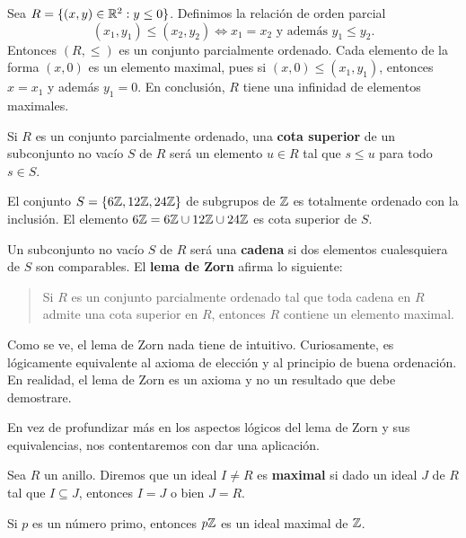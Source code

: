 \begin{example}
Sea $R=\{(x,y)\in\mathbb{R}^2:y\leq 0\}$. Definimos la relación de orden parcial 
\[
(x_1,y_1)\leq (x_2,y_2)\Longleftrightarrow x_1=x_2\text{ y además }y_1\leq y_2.
\]
Entonces $(R,\leq)$ es un conjunto parcialmente ordenado. Cada elemento de la forma $(x,0)$ 
es un elemento maximal, pues si $(x,0)\leq (x_1,y_1)$, entonces $x=x_1$ y además $y_1=0$. En conclusión, $R$ tiene
una infinidad de elementos maximales. 	
\end{example}


Si $R$ es un conjunto parcialmente ordenado, una \textbf{cota superior} de un subconjunto no vacío $S$ de $R$ 
será un elemento $u\in R$ tal que $s\leq u$ para todo $s\in S$. 


\begin{example}
El conjunto $S=\{6\mathbb{Z},12\mathbb{Z},24\mathbb{Z}\}$ de subgrupos de $\mathbb{Z}$ 
es totalmente ordenado con la inclusión. El elemento $6\mathbb{Z}=6\mathbb{Z}\cup 12\mathbb{Z}\cup 24\mathbb{Z}$ es
cota superior de $S$. 	
\end{example}

Un subconjunto no vacío $S$ de $R$ 
será una \textbf{cadena} si dos elementos cualesquiera de $S$ son comparables. El \textbf{lema de Zorn} 
afirma lo siguiente:


\begin{quote}
Si $R$ es un conjunto parcialmente ordenado tal que toda cadena en $R$ admite una cota superior en $R$, entonces
$R$ contiene un elemento maximal.	
\end{quote}

Como se ve, el lema de Zorn nada tiene de intuitivo. Curiosamente, es lógicamente equivalente al axioma de elección y al principio de buena ordenación. 
En realidad, el lema 
de Zorn es un axioma y no un resultado que debe demostrare. 

En vez de profundizar más en los aspectos lógicos del lema de Zorn y sus equivalencias, nos contentaremos con dar una aplicación.

\begin{definition}
	Sea $R$ un anillo. Diremos que un ideal $I\ne R$ es \textbf{maximal} si dado un ideal $J$ de $R$ tal que 
	$I\subseteq J$, entonces $I=J$ o bien $J=R$.  
\end{definition}

\begin{example}
Si $p$ es un número primo, entonces $p\mathbb{Z}$ es un ideal maximal de $\mathbb{Z}$.
\end{example}

